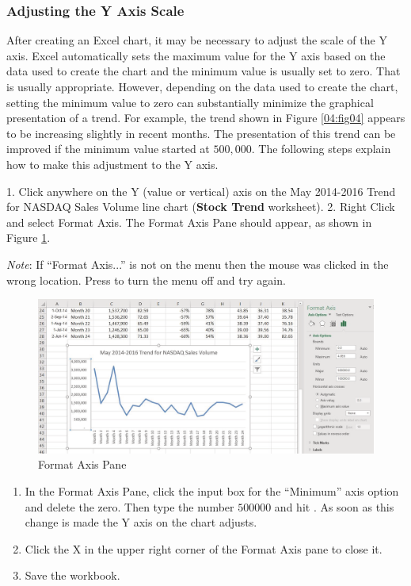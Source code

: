\subsubsection{Adjusting the Y Axis Scale}

After creating an Excel chart, it may be necessary to adjust the scale of the Y axis. Excel automatically sets the maximum value for the Y axis based on the data used to create the chart and the minimum value is usually set to zero. That is usually appropriate. However, depending on the data used to create the chart, setting the minimum value to zero can substantially minimize the graphical presentation of a trend. For example, the trend shown in Figure \ref{04:fig04} appears to be increasing slightly in recent months. The presentation of this trend can be improved if the minimum value started at $ 500,000 $. The following steps explain how to make this adjustment to the Y axis.

1. Click anywhere on the Y (value or vertical) axis on the May 2014-2016 Trend for NASDAQ Sales Volume line chart (\textbf{Stock Trend} worksheet).
2. Right Click and select Format Axis. The Format Axis Pane should appear, as shown in Figure \ref{04:fig05}.

\textit{Note}: If ``Format Axis...'' is not on the menu then the mouse was clicked in the wrong location. Press  to turn the menu off and try again.

\begin{figure}[H]
	\centering
	\includegraphics[width=\maxwidth{.95\linewidth}]{gfx/ch04_fig05}
	\caption{Format Axis Pane}
	\label{04:fig05}
\end{figure}

\begin{enumerate}
	\item In the Format Axis Pane, click the input box for the ``Minimum'' axis option and delete the zero. Then type the number $ 500000 $ and hit . As soon as this change is made the Y axis on the chart adjusts.
	\item Click the X in the upper right corner of the Format Axis pane to close it.
	\item Save the workbook.
\end{enumerate}

